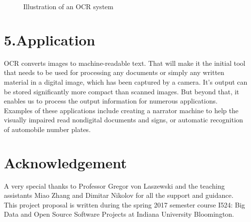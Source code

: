 \documentclass[9pt,twocolumn,twoside]{../../styles/osajnl}
\begin{document}
\begin{figure}
\centering
{}
\caption{Illustration of an OCR system \cite{www-ocr-image}}
\label{fig:Illustration of an OCR system}
\end{figure}

\section{5.Application}

OCR converts images to machine-readable text. That will make it the
initial tool that needs to be used for processing any documents or
simply any written material in a digital image, which has been
captured by a camera\cite{www-ocr-wiki}. It’s output can be stored significantly more
compact than scanned images. But beyond that, it enables us to process
the output information for numerous applications. Examples of these
applications include creating a narrator machine to help the visually
impaired read nondigital documents and signs, or automatic recognition
of automobile number plates.

\section{Acknowledgement}
A very special thanks to Professor Gregor von Laszewski and the
teaching assistants Miao Zhang and Dimitar Nikolov for all the support
and guidance. This project proposal is written during the spring 2017
semester course {I524: Big Data and Open Source Software Projects} at
Indiana University Bloomington.


\end{document}
